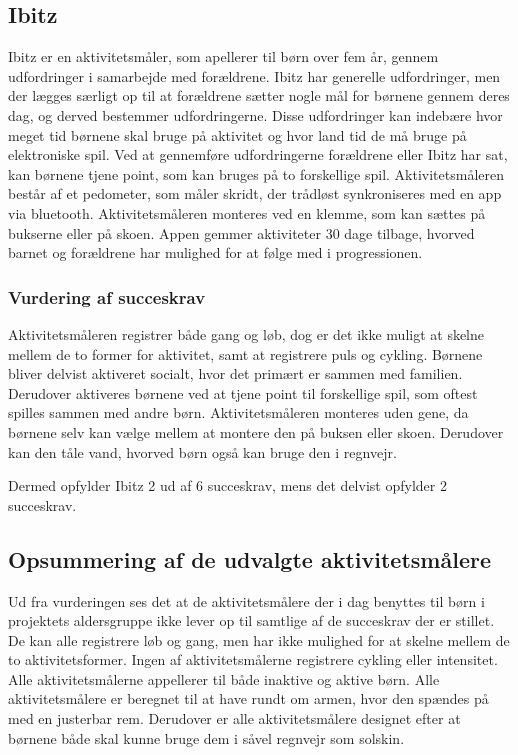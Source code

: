 \subsection{Ibitz}
Ibitz er en aktivitetsmåler, som apellerer til børn over fem år, gennem udfordringer i samarbejde med forældrene. Ibitz har generelle udfordringer, men der lægges særligt op til at forældrene sætter nogle mål for børnene gennem deres dag, og derved bestemmer udfordringerne. Disse udfordringer kan indebære hvor meget tid børnene skal bruge på aktivitet og hvor land tid de må bruge på elektroniske spil. Ved at gennemføre udfordringerne forældrene eller Ibitz har sat, kan børnene tjene point, som kan bruges på to forskellige spil. \newline
Aktivitetsmåleren består af et pedometer, som måler skridt, der trådløst synkroniseres med en app via bluetooth. Aktivitetsmåleren monteres ved en klemme, som kan sættes på bukserne eller på skoen. Appen gemmer aktiviteter 30 dage tilbage, hvorved barnet og forældrene har mulighed for at følge med i progressionen. \citep{Ibitz_features2016}

\subsubsection{Vurdering af succeskrav}
Aktivitetsmåleren registrer både gang og løb, dog er det ikke muligt at skelne mellem de to former for aktivitet, samt at registrere puls og cykling. Børnene bliver delvist aktiveret socialt, hvor det primært er sammen med familien. Derudover aktiveres børnene ved at tjene point til forskellige spil, som oftest spilles sammen med andre børn. Aktivitetsmåleren monteres uden gene, da børnene selv kan vælge mellem at montere den på buksen eller skoen. Derudover kan den tåle vand, hvorved børn også kan bruge den i regnvejr.  

Dermed opfylder Ibitz 2 ud af 6 succeskrav, mens det delvist opfylder 2 succeskrav.

\subsection{Opsummering af de udvalgte aktivitetsmålere}
Ud fra vurderingen ses det at de aktivitetsmålere der i dag benyttes til børn i projektets aldersgruppe ikke lever op til samtlige af de succeskrav der er stillet. De kan alle registrere løb og gang, men har ikke mulighed for at skelne mellem de to aktivitetsformer. Ingen af aktivitetsmålerne registrere cykling eller intensitet. Alle aktivitetsmålerne appellerer til både inaktive og aktive børn. Alle aktivitetsmålere er beregnet til at have rundt om armen, hvor den spændes på med en justerbar rem. Derudover er alle aktivitetsmålere designet efter at børnene både skal kunne bruge dem i såvel regnvejr som solskin.

